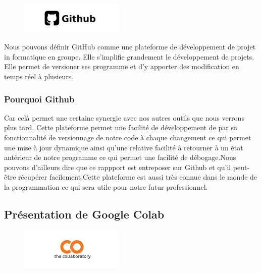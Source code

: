 \begin{figure}[h]
  \begin{center}
  \includegraphics[width=5cm]{./images/github.jpg}
  \end{center}
\end{figure}

Nous pouvons définir GitHub comme une plateforme de développement de projet in formatique en groupe. Elle s'implifie grandement le développement de projets. Elle permet de versioner ses programme et d'y apporter des modification en temps réel à plusieurs.

\hypertarget{Pourquoi-Github}{%
\subsubsection{Pourquoi Github}
\label{Pourquoi-Github}}
Car celà permet une certaine synergie avec nos autres outils que nous verrons plus tard. Cette plateforme permet une facilité de développement de par sa fonctionnalité de versionnage de notre code à chaque changement ce qui permet une mise à jour dynamique ainsi qu'une relative facilité à retourner à un état antérieur de notre programme ce qui permet une facilité de débogage.Nous pouvons d'ailleurs dire que ce rappport est entreposer sur Github et qu'il peut-être récupérer facilement.Cette plateforme est aussi très connue dans le monde de la programmation ce qui sera utile pour notre futur professionnel.

\hypertarget{Pruxe9sentation-de-Google-Colab}{%
\subsection{Présentation de Google Colab}
\label{Pruxe9sentation-de-Google-Colab}}

\begin{figure}[h]
\begin{center}
\includegraphics[width=5cm]{./images/Colab_logo.png}
\end{center}
\end{figure}

